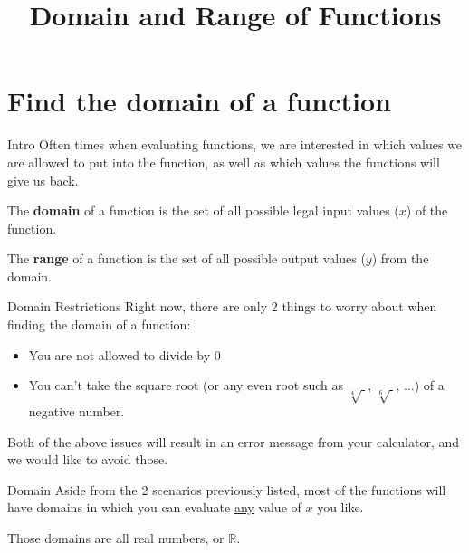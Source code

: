 \documentclass[t]{beamer}
\title{Domain and Range of Functions}
\author{}
\date{}
\begin{document}
\section{Find the domain of a function}

\begin{frame}{Intro}
Often times when evaluating functions, we are interested in which values we are allowed to put into the function, as well as which values the functions will give us back.	\newline\\	\pause

\begin{tcolorbox}[colback= red!25!white, colframe=red!30!blue, title=Domain]
The \textbf{domain} of a function is the set of all possible legal input values ($x$) of the function.
\end{tcolorbox}	\vspace{8pt} \pause

\begin{tcolorbox}[colback= red!25!white, colframe=red!30!blue, title=Range]
The \textbf{range} of a function is the set of all possible output values ($y$) from the domain.
\end{tcolorbox}
\end{frame}

\begin{frame}{Domain Restrictions}
Right now, there are only 2 things to worry about when finding the domain of a function:	\newline\\	\pause
\begin{itemize}
	\item You are not allowed to divide by 0	\newline\\	\pause
	\item You can't take the square root (or any even root such as $\sqrt[4]{\;}, \, \sqrt[6]{\;}, \, \dots$) of a negative number.	\newline\\	\pause
\end{itemize}

Both of the above issues will result in an error message from your calculator, and we would like to avoid those. 
\end{frame}

\begin{frame}{Domain}
Aside from the 2 scenarios previously listed, most of the functions will have domains in which you can evaluate \underline{any} value of $x$ you like.	\newline\\	\pause

Those domains are \alert{all real numbers}, or $\mathbb{R}$.
\end{frame}
\end{document}
